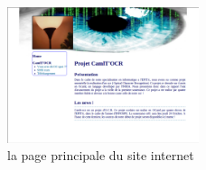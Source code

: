 \begin{figure}[h]
  \begin{center}
\includegraphics[width=0.50\textwidth]{site.png}
\caption{la page principale du site internet}
\end{center}
\end{figure}